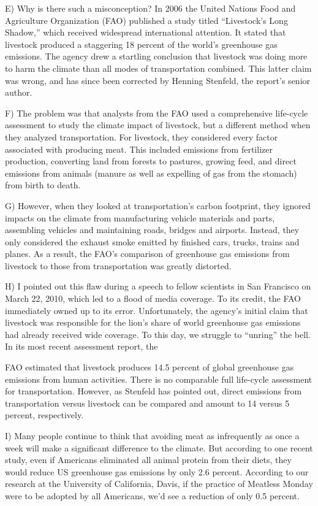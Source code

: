 \documentclass[UTF8,11pt]{ctexart}
\begin{document}
E) Why is there such a misconception? In 2006 the United Nations Food and Agriculture Organization (FAO) published a study titled “Livestock’s Long Shadow,” which received widespread international attention. It stated that livestock produced a staggering 18 percent of the world’s greenhouse gas emissions. The agency drew a startling conclusion that livestock was doing more to harm the climate than all modes of transportation combined. This latter claim was wrong, and has since been corrected by Henning Stenfeld, the report’s senior author.


F) The problem was that analysts from the FAO used a comprehensive life-cycle assessment to study the climate impact of livestock, but a different method when they analyzed transportation. For livestock, they considered every factor associated with producing meat. This included emissions from fertilizer production, converting land from forests to pastures, growing feed, and direct emissions from animals (manure as well as expelling of gas from the stomach) from birth to death.


G) However, when they looked at transportation’s carbon footprint, they ignored impacts on the climate from manufacturing vehicle materials and parts, assembling vehicles and maintaining roads, bridges and airports. Instead, they only considered the exhaust smoke emitted by finished cars, trucks, trains and planes. As a result, the FAO’s comparison of greenhouse gas emissions from livestock to those from transportation was greatly distorted.


H) I pointed out this flaw during a speech to fellow scientists in San Francisco on March 22, 2010, which led to a flood of media coverage. To its credit, the FAO immediately owned up to its error. Unfortunately, the agency’s initial claim that livestock was responsible for the lion’s share of world greenhouse gas emissions had already received wide coverage. To this day, we struggle to “unring” the bell. In its most recent assessment report, the


FAO estimated that livestock produces 14.5 percent of global greenhouse gas emissions from human activities. There is no comparable full life-cycle assessment for transportation. However, as Stenfeld has pointed out, direct emissions from transportation versus livestock can be compared and amount to 14 versus 5 percent, respectively.


I) Many people continue to think that avoiding meat as infrequently as once a week will make a significant difference to the climate. But according to one recent study, even if Americans eliminated all animal protein from their diets, they would reduce US greenhouse gas emissions by only 2.6 percent. According to our research at the University of California, Davis, if the practice of Meatless Monday were to be adopted by all Americans, we’d see a reduction of only 0.5 percent.
\end{document}
